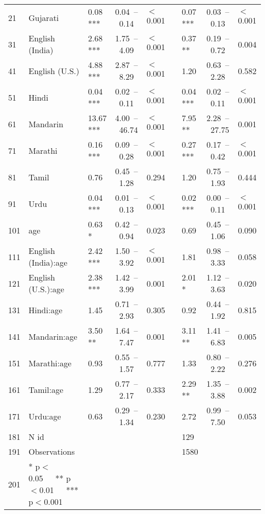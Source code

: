 \begin{table}[ht]
\begin{tabular}{}
  21 & Gujarati & 0.08 *** & 0.04 – 0.14 & $<$0.001 &  & 0.07 *** & 0.03 – 0.13 & $<$0.001 \\ 
  31 & English (India) & 2.68 *** & 1.75 – 4.09 & $<$0.001 &  & 0.37 ** & 0.19 – 0.72 & 0.004 \\ 
  41 & English (U.S.) & 4.88 *** & 2.87 – 8.29 & $<$0.001 &  & 1.20 & 0.63 – 2.28 & 0.582 \\ 
  51 & Hindi & 0.04 *** & 0.02 – 0.11 & $<$0.001 &  & 0.04 *** & 0.02 – 0.11 & $<$0.001 \\ 
  61 & Mandarin & 13.67 *** & 4.00 – 46.74 & $<$0.001 &  & 7.95 ** & 2.28 – 27.75 & 0.001 \\ 
  71 & Marathi & 0.16 *** & 0.09 – 0.28 & $<$0.001 &  & 0.27 *** & 0.17 – 0.42 & $<$0.001 \\ 
  81 & Tamil & 0.76 & 0.45 – 1.28 & 0.294 &  & 1.20 & 0.75 – 1.93 & 0.444 \\ 
  91 & Urdu & 0.04 *** & 0.01 – 0.13 & $<$0.001 &  & 0.02 *** & 0.00 – 0.11 & $<$0.001 \\ 
  101 & age & 0.63 * & 0.42 – 0.94 & 0.023 &  & 0.69 & 0.45 – 1.06 & 0.090 \\ 
  111 & English (India):age & 2.42 *** & 1.50 – 3.92 & $<$0.001 &  & 1.81 & 0.98 – 3.33 & 0.058 \\ 
  121 & English (U.S.):age & 2.38 *** & 1.42 – 3.99 & 0.001 &  & 2.01 * & 1.12 – 3.63 & 0.020 \\ 
  131 & Hindi:age & 1.45 & 0.71 – 2.93 & 0.305 &  & 0.92 & 0.44 – 1.92 & 0.815 \\ 
  141 & Mandarin:age & 3.50 ** & 1.64 – 7.47 & 0.001 &  & 3.11 ** & 1.41 – 6.83 & 0.005 \\ 
  151 & Marathi:age & 0.93 & 0.55 – 1.57 & 0.777 &  & 1.33 & 0.80 – 2.22 & 0.276 \\ 
  161 & Tamil:age & 1.29 & 0.77 – 2.17 & 0.333 &  & 2.29 ** & 1.35 – 3.88 & 0.002 \\ 
  171 & Urdu:age & 0.63 & 0.29 – 1.34 & 0.230 &  & 2.72 & 0.99 – 7.50 & 0.053 \\ 
  181 & N id &  &  &  &  & 129 &  &  \\ 
  191 & Observations &  &  &  &  & 1580 &  &  \\ 
  201 & * p$<$0.05   ** p$<$0.01   *** p$<$0.001 &  &  &  &  &  &  &  \\ 
   \hline
\end{tabular}
\end{table}
